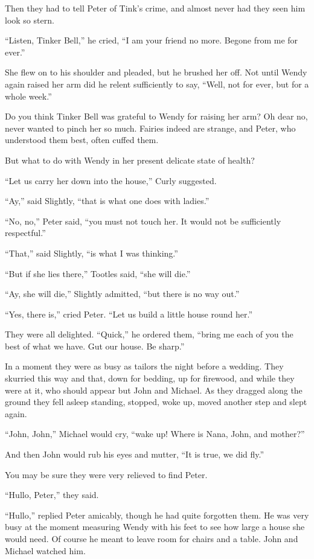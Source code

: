 Then they had to tell Peter of Tink's crime, and almost never had they
seen him look so stern.

``Listen, Tinker Bell,'' he cried, ``I am your friend no more. Begone from
me for ever.''

She flew on to his shoulder and pleaded, but he brushed her off. Not
until Wendy again raised her arm did he relent sufficiently to say,
``Well, not for ever, but for a whole week.''

Do you think Tinker Bell was grateful to Wendy for raising her arm? Oh
dear no, never wanted to pinch her so much. Fairies indeed are strange,
and Peter, who understood them best, often cuffed them.

But what to do with Wendy in her present delicate state of health?

``Let us carry her down into the house,'' Curly suggested.

``Ay,'' said Slightly, ``that is what one does with ladies.''

``No, no,'' Peter said, ``you must not touch her. It would not be
sufficiently respectful.''

``That,'' said Slightly, ``is what I was thinking.''

``But if she lies there,'' Tootles said, ``she will die.''

``Ay, she will die,'' Slightly admitted, ``but there is no way out.''

``Yes, there is,'' cried Peter. ``Let us build a little house round her.''

They were all delighted. ``Quick,'' he ordered them, ``bring me each of
you the best of what we have. Gut our house. Be sharp.''

In a moment they were as busy as tailors the night before a wedding.
They skurried this way and that, down for bedding, up for firewood, and
while they were at it, who should appear but John and Michael. As they
dragged along the ground they fell asleep standing, stopped, woke up,
moved another step and slept again.

``John, John,'' Michael would cry, ``wake up! Where is Nana, John, and
mother?''

And then John would rub his eyes and mutter, ``It is true, we did fly.''

You may be sure they were very relieved to find Peter.

``Hullo, Peter,'' they said.

``Hullo,'' replied Peter amicably, though he had quite forgotten them. He
was very busy at the moment measuring Wendy with his feet to see how
large a house she would need. Of course he meant to leave room for
chairs and a table. John and Michael watched him.


